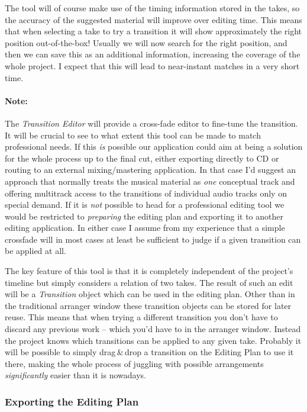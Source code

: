 \documentclass[11pt,a4paper]{article}
\begin{document}
The tool will of course make use of the timing information stored in the takes, so the accuracy of the suggested material will improve over editing time.
This means that when selecting a take to try a transition it will show approximately the right position out-of-the-box!
Usually we will now search for the right position, and then we can save this as an additional information, increasing the coverage of the whole project.
I expect that this will lead to near-instant matches in a very short time.

\paragraph{Note:}
The \emph{Transition Editor} will provide a cross-fade editor to fine-tune the transition.
It will be crucial to see to what extent this tool can be made to match professional needs.
If this \emph{is} possible our application could aim at being a solution for the whole process up to the final cut, either exporting directly to CD or routing to an external mixing/mastering application.
In that case I'd suggest an approach that normally treats the musical material as \emph{one} conceptual track and offering multitrack access to the transitions of individual audio tracks only on special demand.
If it is \emph{not} possible to head for a professional editing tool we would be restricted to \emph{preparing} the editing plan and exporting it to another editing application.
In either case I assume from my experience that a simple crossfade will in most cases at least be sufficient to judge if a given transition can be applied at all.

\medskip
The key feature of this tool is that it is completely independent of the project's timeline but simply considers a relation of two takes.
The result of such an edit will be a \emph{Transition} object which can be used in the editing plan.
Other than in the traditional arranger window these transition objects can be stored for later reuse.
This means that when trying a different transition you don't have to discard any previous work -- which you'd have to in the arranger window.
Instead the project knows which transitions can be applied to any given take.
Probably it will be possible to simply drag\,\&\,drop a transition on the Editing Plan to use it there, making the whole process of juggling with possible arrangements \emph{significantly} easier than it is nowadays.

\subsubsection{Exporting the Editing Plan}
\end{document}
